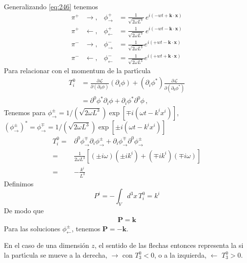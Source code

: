 Generalizando \eqref{eq:246} tenemos
\begin{align}
\label{eq:248}
\pi^+&\to,&  \phi^+_\to&=\frac{1}{\sqrt{2\omega L^3}}\, e^{i(-wt+\mathbf{k}\cdot\mathbf{x})}\nonumber\\
\pi^+&\gets,&  \phi^+_\gets&=\frac{1}{\sqrt{2\omega L^3}}\, e^{i(-wt-\mathbf{k}\cdot\mathbf{x})}\nonumber\\
\pi^-&\to,&    \phi^-_\to&=\frac{1}{\sqrt{2\omega L^3}}e^{i(+wt-\mathbf{k}\cdot\mathbf{x})}\nonumber\\
\pi^-&\gets,&    \phi^-_\gets&=\frac{1}{\sqrt{2\omega L^3}}e^{i(+wt+\mathbf{k}\cdot\mathbf{x})}
\end{align}
Para relacionar con el momentum de la part\'\i cula
\begin{align}
  \label{eq:42}
    T^0_i&=\frac{\partial\mathcal{L}}{\partial(\partial_0\phi)}(\partial_i\phi)+(\partial_i\phi^*)\frac{\partial\mathcal{L}}{\partial(\partial_0\phi^*)}\nonumber\\
&=\partial^0\phi^*\partial_i\phi+\partial_i\phi^*\partial^0\phi\,,
\end{align}
Tenemos para $\phi^\pm_\to=1/(\sqrt{2\omega L^3})\exp{[\mp i(\omega t-k^i x^i)]}$,   ${(\phi^\pm_\to)}^*=\phi^\mp_\to=1/(\sqrt{2\omega L^3})\exp{[\pm i(\omega t-k^i x^i)]}$
\begin{align}
T^0_i=&\partial^0\phi^\mp_\to\partial_i\phi^\pm_\to +\partial_i\phi^\mp_\to\partial^0\phi^\pm_\to \nonumber\\
=&\frac{1}{2\omega L^3}\left[(\pm i\omega)(\pm i k^i)+(\mp i k^i)(\mp i\omega)\right]\nonumber\\
  =&-\frac{k^i}{L^3}
\end{align}
Definimos
\begin{equation}
  P^i=-\int_Vd^3x\,T^0_i=k^i
\end{equation}
De modo que
\begin{align}
  \mathbf{P}=\mathbf{k}
\end{align}
Para las soluciones $\phi^{\pm}_\gets$, tenemos  $\mathbf{P}=-\mathbf{k}$. 

En el caso de una dimensi\'on $z$, el sentido de las flechas entonces representa la si la part\'\i cula se mueve a la derecha, $\to $ con $T^0_3<0$, o a la izquierda, $\gets$ $T^0_3>0$.




